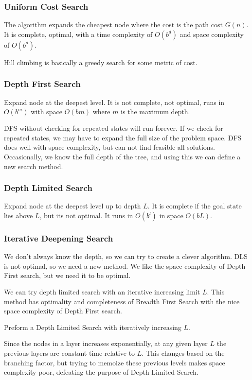 \documentclass{chezarticle}
\begin{document}
\subsubsection{Uniform Cost Search}
\begin{algorithm}
The algorithm expands the cheapest node where the cost is the path cost $G(n)$. It is complete, optimal, with a time complexity of $O(b^d)$ and space complexity of $O(b^d)$.
\end{algorithm}
Hill climbing is basically a greedy search for some metric of cost. 
\subsubsection{Depth First Search}
\begin{algorithm}
Expand node at the deepest level. It is not complete, not optimal, runs in $O(b^m)$ with space $O(bm)$ where $m$ is the maximum depth. 
\end{algorithm}
DFS without checking for repeated states will run forever. If we check for repeated states, we may have to expand the full size of the problem space. DFS does well with space complexity, but can not find feasible all solutions. Occasionally, we know the full depth of the tree, and using this we can define a new search method.
\subsubsection{Depth Limited Search}
\begin{algorithm}
Expand node at the deepest level up to depth $L$. It is complete if the goal state lies above $L$, but its not optimal. It runs in $O(b^l)$ in space $O(bL)$.
\end{algorithm}
\subsubsection{Iterative Deepening Search}
We don't always know the depth, so we can try to create a clever algorithm. DLS is not optimal, so we need a new method. We like the space complexity of Depth First search, but we need it to be optimal.
\begin{proposition}
We can try depth limited search with an iterative increasing limit $L$. This method has optimality and completeness of Breadth First Search with the nice space complexity of Depth First search.
\end{proposition}
\begin{algorithm}
Preform a Depth Limited Search with iteratively increasing $L$. 
\end{algorithm}
Since the nodes in a layer increases exponentially, at any given layer $L$ the previous layers are constant time relative to $L$. This changes based on the branching factor, but trying to memoize these previous levels makes space complexity poor, defeating the purpose of Depth Limited Search.
\end{document}
